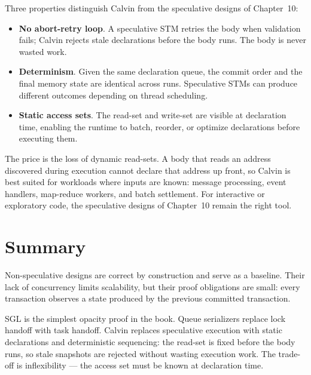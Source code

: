 Three properties distinguish Calvin from the speculative designs of Chapter~10:

\begin{itemize}
    \item \textbf{No abort-retry loop}. A speculative STM retries the body when validation fails; Calvin rejects stale declarations before the body runs. The body is never wasted work.
    \item \textbf{Determinism}. Given the same declaration queue, the commit order and the final memory state are identical across runs. Speculative STMs can produce different outcomes depending on thread scheduling.
    \item \textbf{Static access sets}. The read-set and write-set are visible at declaration time, enabling the runtime to batch, reorder, or optimize declarations before executing them.
\end{itemize}

The price is the loss of dynamic read-sets. A body that reads an address discovered during execution cannot declare that address up front, so Calvin is best suited for workloads where inputs are known: message processing, event handlers, map-reduce workers, and batch settlement. For interactive or exploratory code, the speculative designs of Chapter~10 remain the right tool.

\section{Summary}

Non-speculative designs are correct by construction and serve as a baseline. Their lack of concurrency limits scalability, but their proof obligations are small: every transaction observes a state produced by the previous committed transaction.

SGL is the simplest opacity proof in the book. Queue serializers replace lock handoff with task handoff. Calvin replaces speculative execution with static declarations and deterministic sequencing: the read-set is fixed before the body runs, so stale snapshots are rejected without wasting execution work. The trade-off is inflexibility --- the access set must be known at declaration time.

